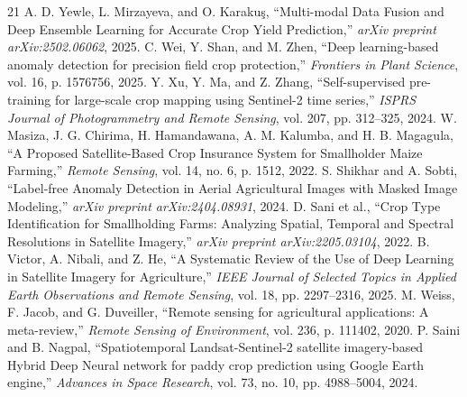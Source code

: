 \documentclass[conference]{IEEEtran}
\begin{document}
\begin{thebibliography}{21}
 A. D. Yewle, L. Mirzayeva, and O. Karakuş, ``Multi-modal Data Fusion and Deep Ensemble Learning for Accurate Crop Yield Prediction,'' \emph{arXiv preprint arXiv:2502.06062}, 2025.
 C. Wei, Y. Shan, and M. Zhen, ``Deep learning-based anomaly detection for precision field crop protection,'' \emph{Frontiers in Plant Science}, vol. 16, p. 1576756, 2025.
 Y. Xu, Y. Ma, and Z. Zhang, ``Self-supervised pre-training for large-scale crop mapping using Sentinel-2 time series,'' \emph{ISPRS Journal of Photogrammetry and Remote Sensing}, vol. 207, pp. 312–325, 2024.
 W. Masiza, J. G. Chirima, H. Hamandawana, A. M. Kalumba, and H. B. Magagula, ``A Proposed Satellite-Based Crop Insurance System for Smallholder Maize Farming,'' \emph{Remote Sensing}, vol. 14, no. 6, p. 1512, 2022.
 S. Shikhar and A. Sobti, ``Label-free Anomaly Detection in Aerial Agricultural Images with Masked Image Modeling,'' \emph{arXiv preprint arXiv:2404.08931}, 2024.
 D. Sani et al., ``Crop Type Identification for Smallholding Farms: Analyzing Spatial, Temporal and Spectral Resolutions in Satellite Imagery,'' \emph{arXiv preprint arXiv:2205.03104}, 2022.
 B. Victor, A. Nibali, and Z. He, ``A Systematic Review of the Use of Deep Learning in Satellite Imagery for Agriculture,'' \emph{IEEE Journal of Selected Topics in Applied Earth Observations and Remote Sensing}, vol. 18, pp. 2297–2316, 2025.
 M. Weiss, F. Jacob, and G. Duveiller, ``Remote sensing for agricultural applications: A meta-review,'' \emph{Remote Sensing of Environment}, vol. 236, p. 111402, 2020.
 P. Saini and B. Nagpal, ``Spatiotemporal Landsat-Sentinel-2 satellite imagery-based Hybrid Deep Neural network for paddy crop prediction using Google Earth engine,'' \emph{Advances in Space Research}, vol. 73, no. 10, pp. 4988–5004, 2024.
\end{thebibliography}
\end{document}
